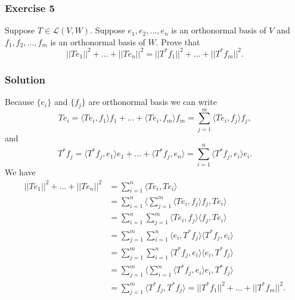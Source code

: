 \subsubsection*{Exercise 5}

Suppose $T \in \mathcal{L}(V, W)$.
Suppose $e_1, e_2, ..., e_n$ is an orthonormal basis of $V$ and $f_1, f_2, ..., f_m$ is an orthonormal basis of $W$.
Prove that
\begin{equation*}
    ||Te_1||^2 + ... + ||Te_n||^2 = ||T^*f_1||^2 + ... + ||T^*f_m||^2.
\end{equation*}

\subsubsection*{Solution}

Because $\{e_i\}$ and $\{f_j\}$ are orthonormal basis we can write
\begin{equation*}
    Te_i = \langle Te_i, f_1 \rangle f_1 + ... + \langle Te_i, f_m \rangle f_m = \sum_{j=1}^m \langle Te_i, f_j \rangle f_j,
\end{equation*}
and
\begin{equation*}
    T^*f_j = \langle T^*f_j, e_1 \rangle e_1 + ... + \langle T^*f_j, e_n \rangle = \sum_{i=1}^n \langle T^*f_j, e_i \rangle e_i.
\end{equation*}
We have
\begin{equation*}
    \begin{split}
        ||Te_1||^2 + ... + ||Te_n||^2
            &= \sum_{i=1}^n \langle Te_i, Te_i \rangle \\
            &= \sum_{i=1}^n \langle \sum_{j=1}^m \langle Te_i, f_j \rangle f_j, Te_i \rangle \\
            &= \sum_{i=1}^n \sum_{j=1}^m \langle Te_i, f_j \rangle \langle f_j, Te_i \rangle \\
            &= \sum_{j=1}^m \sum_{i=1}^n \langle e_i, T^*f_j \rangle \langle T^*f_j, e_i \rangle \\
            &= \sum_{j=1}^m \sum_{i=1}^n \langle T^*f_j, e_i \rangle \langle e_i, T^*f_j \rangle \\
            &= \sum_{j=1}^m \langle \sum_{i=1}^n \langle T^*f_j, e_i \rangle e_i, T^*f_j \rangle \\
            &= \sum_{j=1}^m \langle T^*f_j, T^*f_j \rangle
            = ||T^*f_1||^2 + ... + ||T^*f_m||^2.
    \end{split}
\end{equation*}


